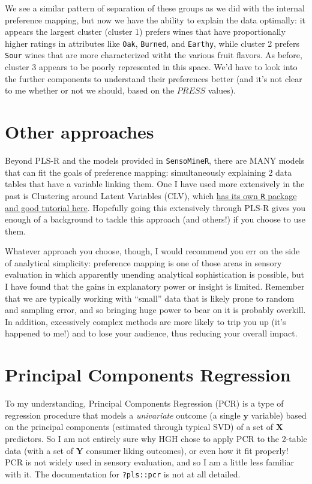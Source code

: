 \documentclass[
]{book}
\begin{document}
We see a similar pattern of separation of these groups as we did with the internal preference mapping, but now we have the ability to explain the data optimally: it appears the largest cluster (cluster 1) prefers wines that have proportionally higher ratings in attributes like \texttt{Oak}, \texttt{Burned}, and \texttt{Earthy}, while cluster 2 prefers \texttt{Sour} wines that are more characterized witht the various fruit flavors. As before, cluster 3 appears to be poorly represented in this space. We'd have to look into the further components to understand their preferences better (and it's not clear to me whether or not we should, based on the \(PRESS\) values).

\section{Other approaches}\label{other-approaches}

Beyond PLS-R and the models provided in \texttt{SensoMineR}, there are MANY models that can fit the goals of preference mapping: simultaneously explaining 2 data tables that have a variable linking them. One I have used more extensively in the past is Clustering around Latent Variables (CLV), which \href{https://pdfs.semanticscholar.org/6f83/755c961579c891a63579a7a5a3bdf5df51e8.pdf}{has its own \texttt{R} package and good tutorial here}. Hopefully going this extensively through PLS-R gives you enough of a background to tackle this approach (and others!) if you choose to use them.

Whatever approach you choose, though, I would recommend you err on the side of analytical simplicity: preference mapping is one of those areas in sensory evaluation in which apparently unending analytical sophistication is possible, but I have found that the gains in explanatory power or insight is limited. Remember that we are typically working with ``small'' data that is likely prone to random and sampling error, and so bringing huge power to bear on it is probably overkill. In addition, excessively complex methods are more likely to trip you up (it's happened to me!) and to lose your audience, thus reducing your overall impact.

\section{Principal Components Regression}\label{principal-components-regression}

To my understanding, Principal Components Regression (PCR) is a type of regression procedure that models a \emph{univariate} outcome (a single \(\mathbf{y}\) variable) based on the principal components (estimated through typical SVD) of a set of \(\mathbf{X}\) predictors. So I am not entirely sure why HGH chose to apply PCR to the 2-table data (with a set of \(\mathbf{Y}\) consumer liking outcomes), or even how it fit properly! PCR is not widely used in sensory evaluation, and so I am a little less familiar with it. The documentation for \texttt{?pls::pcr} is not at all detailed.
\end{document}
